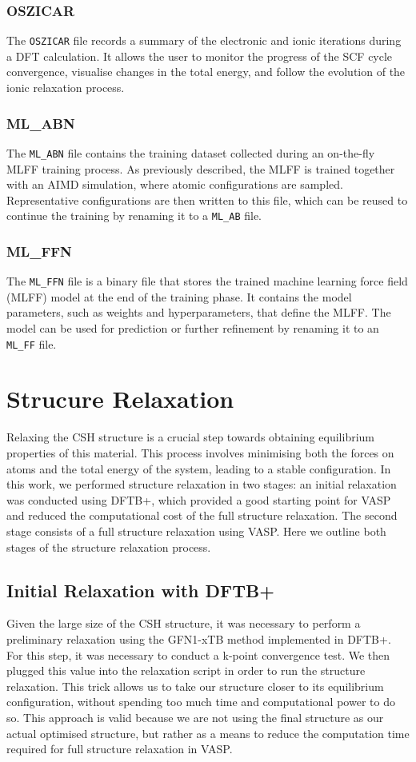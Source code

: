 \subsubsection{OSZICAR}
The \texttt{OSZICAR} file records a summary of the electronic and ionic iterations during a DFT calculation. It allows the user to monitor the progress of the SCF cycle convergence, visualise changes in the total energy, and follow the evolution of the ionic relaxation process. 
\subsubsection{ML\_ABN}
The \texttt{ML\_ABN} file contains the training dataset collected during an on-the-fly MLFF training process. As previously described, the MLFF is trained together with an AIMD simulation, where atomic configurations are sampled. Representative configurations are then written to this file, which can be reused to continue the training by renaming it to a \texttt{ML\_AB} file.

\subsubsection{ML\_FFN}
The \texttt{ML\_FFN} file is a binary file that stores the trained machine learning force field (MLFF) model at the end of the training phase. It contains the model parameters, such as weights and hyperparameters, that define the MLFF. The model can be used for prediction or further refinement by renaming it to an \texttt{ML\_FF} file.


\section{Strucure Relaxation}
\label{sec:structure-relaxation}
Relaxing the CSH structure is a crucial step towards obtaining equilibrium properties of this material. This process involves minimising both the forces on atoms and the total energy of the system, leading to a stable configuration. In this work, we performed structure relaxation in two stages: an initial relaxation was conducted using DFTB+, which provided a good starting point for VASP and reduced the computational cost of the full structure relaxation. The second stage consists of a full structure relaxation using VASP. Here we outline both stages of the structure relaxation process.

\subsection{Initial Relaxation with DFTB+}
Given the large size of the CSH structure, it was necessary to perform a preliminary relaxation using the GFN1-xTB method implemented in DFTB+. For this step, it was necessary to conduct a k-point convergence test. We then plugged this value into the relaxation script in order to run the structure relaxation. This trick allows us to take our structure closer to its equilibrium configuration, without spending too much time and computational power to do so. This approach is valid because we are not using the final structure as our actual optimised structure, but rather as a means to reduce the computation time required for full structure relaxation in VASP.  

